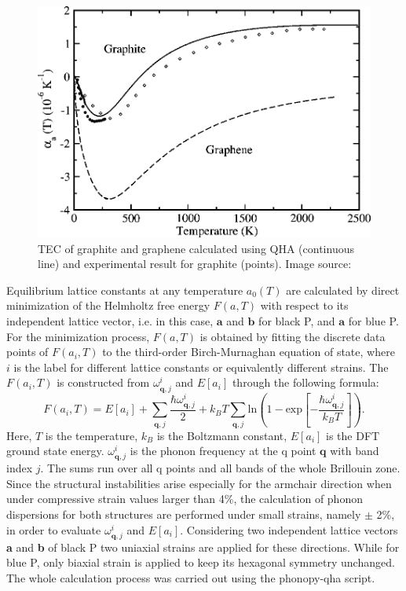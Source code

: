 \begin{figure}[htbp!] 
\centering
\includegraphics[width=0.8\linewidth]{qha_gra.png}%
\caption{ TEC of graphite and graphene calculated using QHA (continuous line) and experimental result for graphite (points). Image source: \cite{QHA1} }
\label{fig:qha_gra}
\end{figure}

Equilibrium lattice constants at any temperature $a_0(T)$ are calculated by direct minimization of the Helmholtz free energy $F(a,T)$ with respect to its independent lattice vector, i.e. in this case, $\mathbf{a}$ and $\mathbf{b}$ for black P, and $\mathbf{a}$ for blue P. For the minimization process, $F(a,T)$ is obtained by fitting the discrete data points of $F({a_i,T})$ to the third-order Birch-Murnaghan equation of state, where $i$ is the label for different lattice constants or equivalently different strains. The $F({a_i,T})$ is constructed from $\omega^i_{\mathbf{q},j}$ and $E[a_i]$ through the following formula\cite{QHA0,QHA1}:
\begin{equation}\label{eq:free-enerji}
F({a_i,T}) = E[a_i]+\sum_{\mathbf{q},j}\frac{\hbar \omega^i_{\mathbf{q},j}}{2} +k_BT\sum_{\mathbf{q},j}\text{ln}\left( 1-\text{exp} \left[ -\frac{\hbar \omega^i_{\mathbf{q},j}}{k_BT} \right]\right).
\end{equation}
Here, $T$ is the temperature, $k_B$ is the Boltzmann constant, $E[a_i]$ is the DFT ground state energy. $\omega^i_{\mathbf{q},j}$ is the phonon frequency at the q point $\mathbf{q}$ with band index $j$. 
The sums  run over all q points and all bands of the whole Brillouin zone. Since the structural instabilities arise especially for the armchair direction when under compressive strain values larger than 4\%,  the calculation of phonon dispersions for both structures are performed under small strains, namely $\pm$ 2\%,  in order to evaluate $\omega^i_{\mathbf{q},j}$ and $E[a_i]$. Considering two independent lattice vectors \textbf{a} and \textbf{b} of black P two uniaxial strains are applied for these directions. While for blue P, only biaxial strain is applied to keep its hexagonal symmetry unchanged. The whole calculation process was carried out using the phonopy-qha script\cite{phonopy-qha}.

